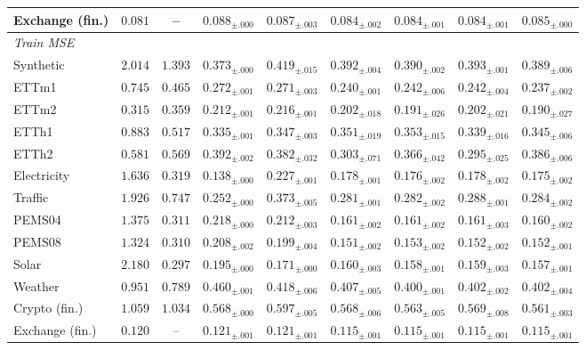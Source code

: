 \begin{tabular}{lcccccccc}
Exchange (fin.) & $\mathbf{0.081}$ & -- & $0.088_{\pm.000}$ & $0.087_{\pm.003}$ & $0.084_{\pm.002}$ & $0.084_{\pm.001}$ & $0.084_{\pm.001}$ & $0.085_{\pm.000}$ \\
\midrule
\multicolumn{9}{l}{\emph{Train MSE}} \\
Synthetic & $2.014$ & $1.393$ & $0.373_{\pm.000}$ & $0.419_{\pm.015}$ & $0.392_{\pm.004}$ & $0.390_{\pm.002}$ & $0.393_{\pm.001}$ & $0.389_{\pm.006}$ \\
ETTm1 & $0.745$ & $0.465$ & $0.272_{\pm.001}$ & $0.271_{\pm.003}$ & $0.240_{\pm.001}$ & $0.242_{\pm.006}$ & $0.242_{\pm.004}$ & $0.237_{\pm.002}$ \\
ETTm2 & $0.315$ & $0.359$ & $0.212_{\pm.001}$ & $0.216_{\pm.001}$ & $0.202_{\pm.018}$ & $0.191_{\pm.026}$ & $0.202_{\pm.021}$ & $0.190_{\pm.027}$ \\
ETTh1 & $0.883$ & $0.517$ & $0.335_{\pm.001}$ & $0.347_{\pm.003}$ & $0.351_{\pm.019}$ & $0.353_{\pm.015}$ & $0.339_{\pm.016}$ & $0.345_{\pm.006}$ \\
ETTh2 & $0.581$ & $0.569$ & $0.392_{\pm.002}$ & $0.382_{\pm.032}$ & $0.303_{\pm.071}$ & $0.366_{\pm.042}$ & $0.295_{\pm.025}$ & $0.386_{\pm.006}$ \\
Electricity & $1.636$ & $0.319$ & $0.138_{\pm.000}$ & $0.227_{\pm.001}$ & $0.178_{\pm.001}$ & $0.176_{\pm.002}$ & $0.178_{\pm.002}$ & $0.175_{\pm.002}$ \\
Traffic & $1.926$ & $0.747$ & $0.252_{\pm.000}$ & $0.373_{\pm.005}$ & $0.281_{\pm.001}$ & $0.282_{\pm.002}$ & $0.288_{\pm.001}$ & $0.284_{\pm.002}$ \\
PEMS04 & $1.375$ & $0.311$ & $0.218_{\pm.000}$ & $0.212_{\pm.003}$ & $0.161_{\pm.002}$ & $0.161_{\pm.002}$ & $0.161_{\pm.003}$ & $0.160_{\pm.002}$ \\
PEMS08 & $1.324$ & $0.310$ & $0.208_{\pm.002}$ & $0.199_{\pm.004}$ & $0.151_{\pm.002}$ & $0.153_{\pm.002}$ & $0.152_{\pm.002}$ & $0.152_{\pm.001}$ \\
Solar & $2.180$ & $0.297$ & $0.195_{\pm.000}$ & $0.171_{\pm.000}$ & $0.160_{\pm.003}$ & $0.158_{\pm.001}$ & $0.159_{\pm.003}$ & $0.157_{\pm.001}$ \\
Weather & $0.951$ & $0.789$ & $0.460_{\pm.001}$ & $0.418_{\pm.006}$ & $0.407_{\pm.005}$ & $0.400_{\pm.001}$ & $0.402_{\pm.002}$ & $0.402_{\pm.004}$ \\
Crypto (fin.) & $1.059$ & $1.034$ & $0.568_{\pm.000}$ & $0.597_{\pm.005}$ & $0.568_{\pm.006}$ & $0.563_{\pm.005}$ & $0.569_{\pm.008}$ & $0.561_{\pm.003}$ \\
Exchange (fin.) & $0.120$ & -- & $0.121_{\pm.001}$ & $0.121_{\pm.001}$ & $0.115_{\pm.001}$ & $0.115_{\pm.001}$ & $0.115_{\pm.001}$ & $0.115_{\pm.001}$ \\
\bottomrule
\end{tabular}
